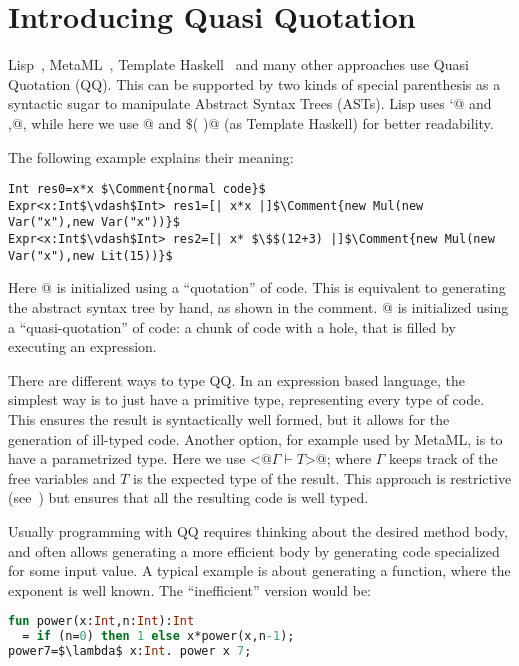
\section{Introducing Quasi Quotation}

Lisp~\cite{pitman1980special}, MetaML~\cite{moggi1999idealized}, Template Haskell~\cite{sheard2002template} and many other approaches use Quasi Quotation (QQ).
This can be supported by two kinds of special parenthesis as a syntactic sugar to manipulate Abstract Syntax Trees (ASTs).
Lisp uses \Q@`@ and \Q@,@, while here we use
\Q@[|  |]@  and \Q@$\$$(  )@ (as Template Haskell) 
for better readability.

The following example explains their meaning: 

\begin{lstlisting}
Int res0=x*x $\Comment{normal code}$
Expr<x:Int$\vdash$Int> res1=[| x*x |]$\Comment{new Mul(new Var("x"),new Var("x"))}$
Expr<x:Int$\vdash$Int> res2=[| x* $\$$(12+3) |]$\Comment{new Mul(new Var("x"),new Lit(15))}$
\end{lstlisting}

Here @ is initialized using a ``quotation'' of code.
This is equivalent to generating the abstract syntax tree by hand, as shown in the comment.
@ is initialized using a ``quasi-quotation'' of code: a chunk of code with a hole, that is filled by executing an expression.

There are different ways to type QQ.
In an expression based language, 
the simplest way is to just have a primitive \Q@Expr@ type,
representing every type of code.
This ensures the result is syntactically well formed, but
it allows for the generation of ill-typed code.
Another option, for example used by MetaML,
is to have a parametrized type.
Here we use \Q@Expr<@$\Gamma\vdash T$\Q@>@; where
$\Gamma$ keeps track of the free variables and $T$ is the expected type
of the result.
This approach is restrictive (see~\cite{servetto2014meta})
 but ensures that all the resulting code is well typed.

Usually programming with QQ requires thinking about the desired method body,
 and often allows generating a more efficient body by generating code specialized for some input value.
A typical example is about generating a \Q@pow@ function, where the exponent is well known.
The ``inefficient'' version would be:

\begin{lstlisting}[language=ML]
fun power(x:Int,n:Int):Int 
  = if (n=0) then 1 else x*power(x,n-1);
power7=$\lambda$ x:Int. power x 7;
\end{lstlisting}

